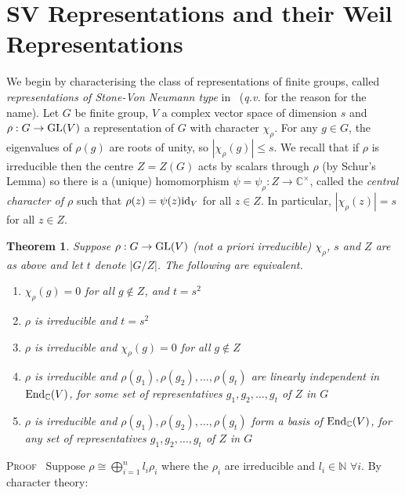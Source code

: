 \documentclass[12pt]{article}
\newtheorem{thm}{Theorem}[section]
\newcommand{\bbC}{\ensuremath{\mathbb{C}}}\newcommand{\bbCp}{\ensuremath{\mathbb{C}_p}}
\newcommand{\bbN}{\ensuremath{\mathbb{N}}}
\newcommand{\bPf}{\noindent \textsc{Proof\ }}
\newcommand{\End}{{\rm End}}
\newcommand{\GL}{{\rm GL}}
\newcommand{\id}{{\rm id}}
\begin{document}
\section{SV Representations and their Weil Representations}\label{reps of SV-type}
We begin by characterising the class of representations of finite groups, called {\em representations of Stone-Von Neumann type} in~\cite[\S3]{Howe} ({\em q.v.} for the reason for the name).
Let $G$ be finite group, $V$ a complex vector space of dimension $s$ and $\rho:G\rightarrow \GL(V)$ a representation of $G$ with character $\chi_\rho$. For any $g\in G$, the  eigenvalues of $\rho(g)$ are roots of unity, so $|\chi_\rho(g)|\leq s$. 
We recall that if $\rho$ is irreducible then the centre $Z=Z(G)$ acts by scalars through $\rho$ (by Schur's Lemma) so there is a (unique) homomorphism $\psi=\psi_\rho : Z\rightarrow \bbC^\times$, called  the {\em central character of $\rho$} such that $\rho(z)=\psi(z)\id_V$ for all $z\in Z$. 
In particular, $|\chi_\rho(z)|=s$ for all  $z\in Z$.  
\begin{thm}\label{thm:equivalent condits for SV} Suppose $\rho:G\rightarrow \GL(V)$ (not {\em a priori} irreducible) $\chi_\rho$, $s$ and $Z$ are as above and let $t$ denote $|G/Z|$. The following are  equivalent. 
	\begin{enumerate}
		\item\label{part1:equivalent condits for SV}  $\chi_\rho(g)=0$ for all $g\nin Z$, and $t=s^2$
		\item\label{part2:equivalent condits for SV}   $\rho$ is irreducible and $t=s^2$ 
		\item\label{partextra:equivalent condits for SV} $\rho$ is irreducible and $\chi_\rho(g)=0$ for all $g\nin Z$
		\item\label{part3:equivalent condits for SV} $\rho$ is irreducible and $\rho(g_1), \rho(g_2),\ldots ,\rho(g_t)$ are linearly independent in $\End_\bbC(V)$, for some set of representatives $g_1,g_2,\ldots,g_t$ of $Z$ in $G$
		\item\label{part4:equivalent condits for SV}
		$\rho$ is irreducible and $\rho(g_1), \rho(g_2),\ldots ,\rho(g_t)$ form a basis of $\End_\bbC(V)$, for any set of representatives $g_1,g_2,\ldots,g_t$ of $Z$ in $G$
	\end{enumerate}	
\end{thm}
\bPf 
Suppose $\rho\cong\bigoplus_{i=1}^n l_i\rho_i$ where the $\rho_i$ are irreducible and $l_i\in \bbN\,\,\forall i$. By character theory: 
\end{document}
